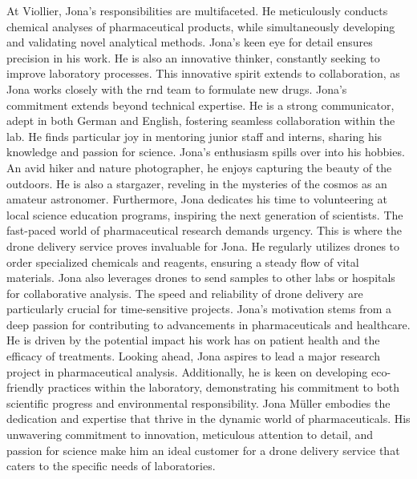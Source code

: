 \newline
At Viollier, Jona's responsibilities are multifaceted. He meticulously conducts chemical analyses of pharmaceutical products, while simultaneously developing and validating novel analytical methods. Jona's keen eye for detail ensures precision in his work. He is also an innovative thinker, constantly seeking to improve laboratory processes. This innovative spirit extends to collaboration, as Jona works closely with the \ac{rnd} team to formulate new drugs.
\newline
Jona's commitment extends beyond technical expertise. He is a strong communicator, adept in both German and English, fostering seamless collaboration within the lab. He finds particular joy in mentoring junior staff and interns, sharing his knowledge and passion for science.
\newline
Jona's enthusiasm spills over into his hobbies. An avid hiker and nature photographer, he enjoys capturing the beauty of the outdoors. He is also a stargazer, reveling in the mysteries of the cosmos as an amateur astronomer. Furthermore, Jona dedicates his time to volunteering at local science education programs, inspiring the next generation of scientists.
\newline
The fast-paced world of pharmaceutical research demands urgency. This is where the drone delivery service proves invaluable for Jona. He regularly utilizes drones to order specialized chemicals and reagents, ensuring a steady flow of vital materials. Jona also leverages drones to send samples to other labs or hospitals for collaborative analysis. The speed and reliability of drone delivery are particularly crucial for time-sensitive projects.
\newline
Jona's motivation stems from a deep passion for contributing to advancements in pharmaceuticals and healthcare. He is driven by the potential impact his work has on patient health and the efficacy of treatments. Looking ahead, Jona aspires to lead a major research project in pharmaceutical analysis. Additionally, he is keen on developing eco-friendly practices within the laboratory, demonstrating his commitment to both scientific progress and environmental responsibility.
\newline
Jona Müller embodies the dedication and expertise that thrive in the dynamic world of pharmaceuticals. His unwavering commitment to innovation, meticulous attention to detail, and passion for science make him an ideal customer for a drone delivery service that caters to the specific needs of laboratories.

